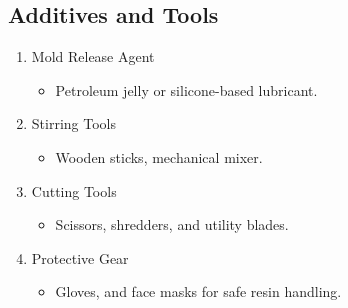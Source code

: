 \subsection{Additives and Tools}
\begin{enumerate}
	\item  Mold Release Agent
	      \begin{itemize}
		      \item Petroleum jelly or silicone-based lubricant.
	      \end{itemize}
	\item Stirring Tools
	      \begin{itemize}
		      \item Wooden sticks, mechanical mixer.
	      \end{itemize}
	\item  Cutting Tools
	      \begin{itemize}
		      \item Scissors, shredders, and utility blades.
	      \end{itemize}
	\item  Protective Gear
	      \begin{itemize}
		      \item Gloves, and face masks for safe resin handling.
	      \end{itemize}
\end{enumerate}
